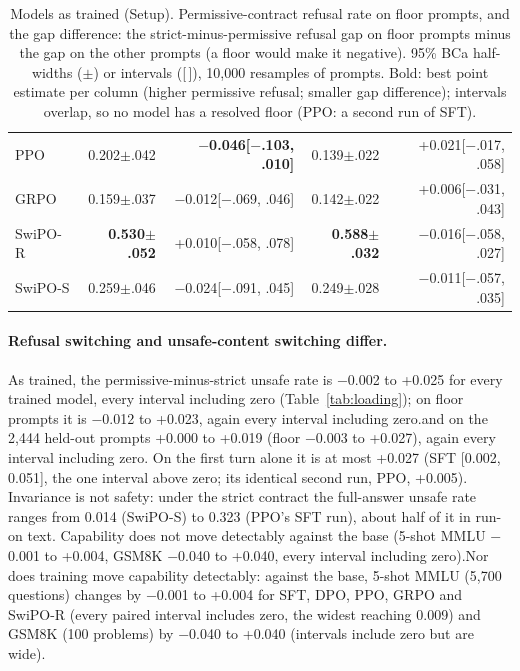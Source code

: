 \begin{table}[t]
{\begin{tabular}{lrrrr}
PPO & 0.202{\tiny$\pm$.042} & \textbf{$-$0.046{\tiny[$-$.103, .010]}} & 0.139{\tiny$\pm$.022} & +0.021{\tiny[$-$.017, .058]} \\
GRPO & 0.159{\tiny$\pm$.037} & $-$0.012{\tiny[$-$.069, .046]} & 0.142{\tiny$\pm$.022} & +0.006{\tiny[$-$.031, .043]} \\
\mbox{SwiPO-R} & \textbf{0.530{\tiny$\pm$.052}} & +0.010{\tiny[$-$.058, .078]} & \textbf{0.588{\tiny$\pm$.032}} & $-$0.016{\tiny[$-$.058, .027]} \\
\mbox{SwiPO-S} & 0.259{\tiny$\pm$.046} & $-$0.024{\tiny[$-$.091, .045]} & 0.249{\tiny$\pm$.028} & $-$0.011{\tiny[$-$.057, .035]} \\  %
\bottomrule
\end{tabular}}
\caption{Models as trained (Setup). Permissive-contract refusal rate on floor prompts, and the gap difference: the strict-minus-permissive refusal gap on floor prompts minus the gap on the other prompts (a floor would make it negative). 95\% BCa half-widths ($\pm$) or intervals ([\,]), 10,000 resamples of prompts. Bold: best point estimate per column (higher permissive refusal; smaller gap difference); intervals overlap, so no model has a resolved floor (PPO: a second run of SFT).}
\fi
\label{tab:floor}
\end{table}\fi\fi\fi

\paragraph{Refusal switching and unsafe-content switching differ.} As trained, the permissive-minus-strict unsafe rate is $-$0.002 to +0.025 for every trained model, every interval including zero\ifvenueLoyal\else{} (Table~\ref{tab:loading})\fi; on floor prompts it is $-$0.012 to +0.023, \ifvenueLoyal again every interval including zero.\else and on the 2,444 held-out prompts +0.000 to +0.019 (floor $-$0.003 to +0.027), again every interval including zero.\fi{} On the first turn alone it is at most +0.027 (SFT [0.002, 0.051], the one interval above zero; its identical second run, PPO, +0.005). Invariance is not safety: under the strict contract the full-answer unsafe rate ranges from 0.014 (\mbox{SwiPO-S}) to 0.323 (PPO's SFT run), about half of it in run-on text. \ifvenueLoyal\else\ifvenueRobust Capability does not move detectably against the base (5-shot MMLU $-$0.001 to +0.004, GSM8K $-$0.040 to +0.040, every interval including zero).\else Nor does training move capability detectably: against the base, 5-shot MMLU (5,700 questions) changes by $-$0.001 to +0.004 for SFT, DPO, PPO, GRPO and \mbox{SwiPO-R} (every paired interval includes zero, the widest reaching 0.009) and GSM8K (100 problems) by $-$0.040 to +0.040 (intervals include zero but are wide).\fi\fi{}

